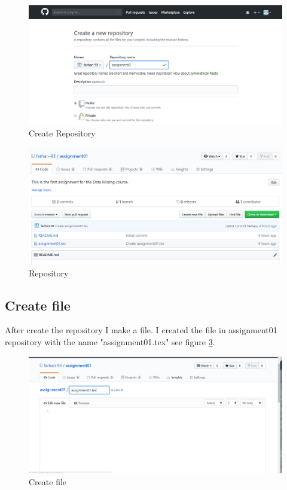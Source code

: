 \documentclass[paper=a4, fontsize=12pt]{scrartcl}
\numberwithin{equation}{section} %
\numberwithin{figure}{section} %
\numberwithin{table}{section} %
\begin{document}
\begin{figure}
\includegraphics[width=\linewidth]{createrepository.PNG}
\caption{Create Repository}
\label{crepo}
\end{figure}

\begin{figure}
\includegraphics[width=\linewidth]{repository.PNG}
\caption{Repository}
\label{repository}
\end{figure}

\subsection{Create file}
After create the repository I make a file. I created the file in assignment01 repository with the name "assignment01.tex" see figure \ref{cfile}.

\begin{figure}
\includegraphics[width=\linewidth]{createfile.PNG}
\caption{Create file}
\label{cfile}
\end{figure}
\end{document}
